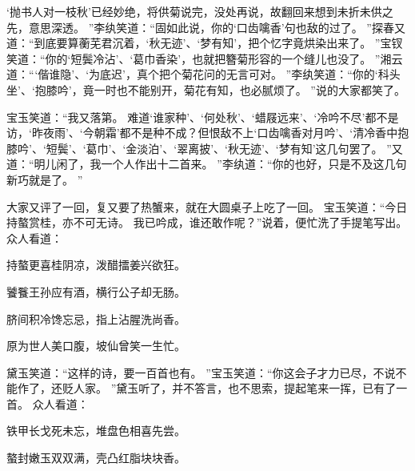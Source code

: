 ‘抛书人对一枝秋’已经妙绝，将供菊说完，没处再说，故翻回来想到未折未供之先，意思深透。
”李纨笑道：“固如此说，你的‘口齿噙香’句也敌的过了。
”探春又道：“到底要算蘅芜君沉着，‘秋无迹’、‘梦有知’，把个忆字竟烘染出来了。
”宝钗笑道：“你的‘短鬓冷沾’、‘葛巾香染’，也就把簪菊形容的一个缝儿也没了。
”湘云道：“‘偕谁隐’、‘为底迟’，真个把个菊花问的无言可对。
”李纨笑道：“你的‘科头坐’、‘抱膝吟’，竟一时也不能别开，菊花有知，也必腻烦了。
”说的大家都笑了。
\par
宝玉笑道：“我又落第。
难道‘谁家种’、‘何处秋’、‘蜡屐远来’、‘冷吟不尽’都不是访，‘昨夜雨’、‘今朝霜’都不是种不成？但恨敌不上‘口齿噙香对月吟’、‘清冷香中抱膝吟’、‘短鬓’、‘葛巾’、‘金淡泊’、‘翠离披’、‘秋无迹’、‘梦有知’这几句罢了。
”又道：“明儿闲了，我一个人作出十二首来。
”李纨道：“你的也好，只是不及这几句新巧就是了。
”\par
大家又评了一回，复又要了热蟹来，就在大圆桌子上吃了一回。
宝玉笑道：“今日持螯赏桂，亦不可无诗。
我已吟成，谁还敢作呢？”说着，便忙洗了手提笔写出。
众人看道：\par
\hop
持螯更喜桂阴凉，泼醋擂姜兴欲狂。
\par
饕餮王孙应有酒，横行公子却无肠。
\par
脐间积冷馋忘忌，指上沾腥洗尚香。
\par
原为世人美口腹，坡仙曾笑一生忙。
\par
\hop
黛玉笑道：“这样的诗，要一百首也有。
”宝玉笑道：“你这会子才力已尽，不说不能作了，还贬人家。
”黛玉听了，并不答言，也不思索，提起笔来一挥，已有了一首。
众人看道：\par
\hop
铁甲长戈死未忘，堆盘色相喜先尝。
\par
螯封嫩玉双双满，壳凸红脂块块香。
\par
